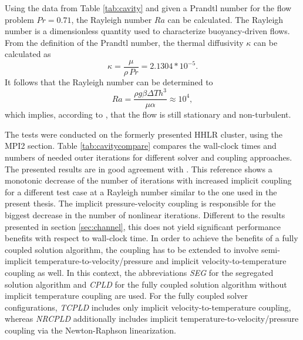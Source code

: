 Using the data from Table \ref{tab:cavity} and given a Prandtl number for the flow problem \(Pr = 0.71\), the Rayleigh number \(Ra\) can be calculated. The Rayleigh number is a dimensionless quantity used to characterize buoyancy-driven flows. From the definition of the Prandtl number, the thermal diffusivity \(\kappa\) can be calculated as
\begin{displaymath}
  \kappa = \frac{\mu}{\rho \, Pr} = 2.1304 * 10^{-5}.
\end{displaymath}
It follows that the Rayleigh number can be determined to 
\begin{displaymath}
  Ra = \frac{\rho g \beta \Delta T h^3}{\mu \alpha} \approx 10^4,
\end{displaymath}
which implies, according to \cite{christon02}, that the flow is still stationary and non-turbulent.

The tests were conducted on the formerly presented HHLR cluster, using the MPI2 section. Table \ref{tab:cavitycompare} compares the wall-clock times and numbers of needed outer iterations for different solver and coupling approaches. The presented results are in good agreement with \cite{vakilipour12}. This reference shows a monotonic decrease of the number of iterations with increased implicit coupling for a different test case at a Rayleigh number similar to the one used in the present thesis. The implicit pressure-velocity coupling is responsible for the biggest decrease in the number of nonlinear iterations. Different to the results presented in section \ref{sec:channel}, this does not yield significant performance benefits with respect to wall-clock time. In order to achieve the benefits of a fully coupled solution algorithm, the coupling has to be extended to involve semi-implicit temperature-to-velocity/pressure and implicit velocity-to-temperature coupling as well. In this context, the abbreviations \emph{SEG} for the segregated solution algorithm and \emph{CPLD} for the fully coupled solution algorithm without implicit temperature coupling are used. For the fully coupled solver configurations, \emph{TCPLD} includes only implicit velocity-to-temperature coupling, whereas \emph{NRCPLD} additionally includes implicit temperature-to-velocity/pressure coupling via the Newton-Raphson linearization.

